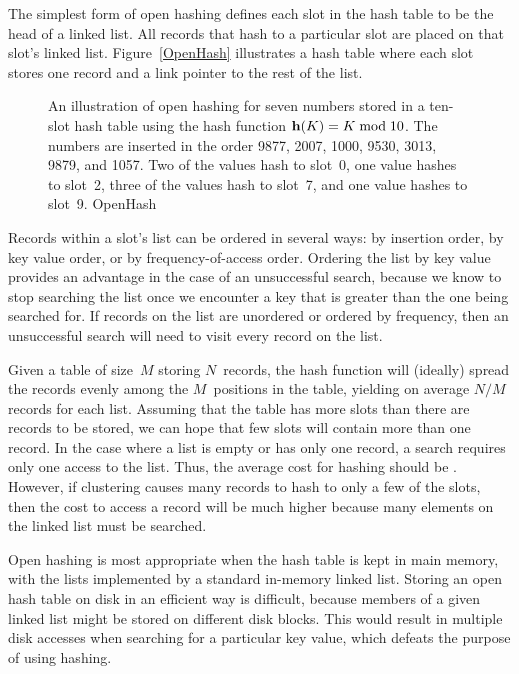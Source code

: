 The simplest form of open hashing defines each slot in the
hash table to be the head of a linked list.
All records that hash to a particular slot are placed on that slot's
linked list.
Figure~\ref{OpenHash} illustrates a hash table where each
slot stores one record and a link pointer to the rest of the list.

\begin{figure}
\vspace{-\smallskipamount}

{An illustration of open hashing for seven numbers stored in a
ten-slot hash table using the hash function
\( {\bf h}(K) = K \bmod 10\).
The numbers are inserted in the order 9877, 2007, 1000, 9530, 3013,
9879, and 1057.
Two of the values hash to slot~0, one value hashes to slot~2,
three of the values hash to slot~7, and one value hashes to slot~9.
}{OpenHash}
\bigskip
\end{figure}

Records within a slot's list can be ordered in several ways:
by insertion order, by key value order, or by frequency-of-access
order.
Ordering the list by key value provides an advantage in the case of an 
unsuccessful search, because we know to stop searching the list once
we encounter a key that is greater than the one being searched for.
If records on the list are unordered or ordered by frequency, then an
unsuccessful search will need to visit every record on the list.

Given a table of size~\(M\) storing \(N\)~records, the hash function
will (ideally) spread the records evenly among the \(M\)~positions in
the table, yielding on average \(N/M\) records for each list.
Assuming that the table has more slots than there are records to be
stored, we can hope that few slots will contain more than one record.
In the case where a list is empty or has only one record,
a search requires only one access to the list.
Thus, the average cost for hashing should be \Thetaone.
However, if clustering causes many records to hash to only a few of
the slots, then the cost to access a record will be much higher
because many elements on the linked list must be searched.

Open hashing is most appropriate when the hash table is kept in main
memory, with the lists implemented by a standard in-memory linked
list.
Storing an open hash table on disk in an efficient way is
difficult, because members of a given linked list might be stored on
different disk blocks.
This would result in multiple disk accesses when searching for a
particular key value, which defeats the purpose of using hashing.

